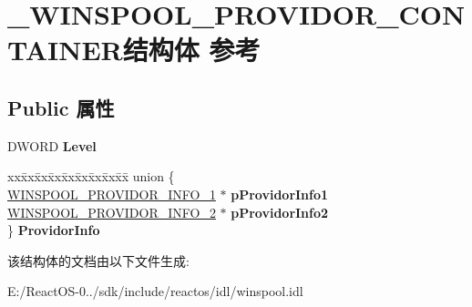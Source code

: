 \hypertarget{struct___w_i_n_s_p_o_o_l___p_r_o_v_i_d_o_r___c_o_n_t_a_i_n_e_r}{}\section{\+\_\+\+W\+I\+N\+S\+P\+O\+O\+L\+\_\+\+P\+R\+O\+V\+I\+D\+O\+R\+\_\+\+C\+O\+N\+T\+A\+I\+N\+E\+R结构体 参考}
\label{struct___w_i_n_s_p_o_o_l___p_r_o_v_i_d_o_r___c_o_n_t_a_i_n_e_r}
\subsection*{Public 属性}
\begin{DoxyCompactItemize}
\item 
\mbox{\label{struct___w_i_n_s_p_o_o_l___p_r_o_v_i_d_o_r___c_o_n_t_a_i_n_e_r_ac3dfe6d7130cce1ccf0afeff48dd1492}} 
D\+W\+O\+RD {\bfseries Level}
\item 
\mbox{\label{struct___w_i_n_s_p_o_o_l___p_r_o_v_i_d_o_r___c_o_n_t_a_i_n_e_r_a8883b9b4bbc4d6ecdd024d8fd260120d}} 
\begin{tabbing}
xx\=xx\=xx\=xx\=xx\=xx\=xx\=xx\=xx\=\kill
union \{\\
\>\hyperlink{struct___w_i_n_s_p_o_o_l___p_r_o_v_i_d_o_r___i_n_f_o__1}{WINSPOOL\_PROVIDOR\_INFO\_1} $\ast$ {\bfseries pProvidorInfo1}\\
\>\hyperlink{struct___w_i_n_s_p_o_o_l___p_r_o_v_i_d_o_r___i_n_f_o__2}{WINSPOOL\_PROVIDOR\_INFO\_2} $\ast$ {\bfseries pProvidorInfo2}\\
\} {\bfseries ProvidorInfo}\\

\end{tabbing}\end{DoxyCompactItemize}


该结构体的文档由以下文件生成\+:\begin{DoxyCompactItemize}
\item 
E\+:/\+React\+O\+S-\/0../sdk/include/reactos/idl/winspool.\+idl\end{DoxyCompactItemize}
